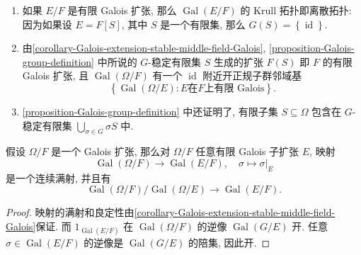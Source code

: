 \begin{remark}
  \label{remark-Galois-group-definition}
  \begin{enumerate}
    \item 如果 \( E/F \) 是有限 Galois 扩张, 那么 \( \operatorname{Gal}(E/F) \)
      的 Krull 拓扑即离散拓扑: 因为如果设 \( E = F[S] \), 其中 \( S \)
      是一个有限集, 那么 \( G(S) = \left\lbrace \operatorname{id} \right\rbrace
      \).
    \item 由\cref{corollary-Galois-extension-stable-middle-field-Galois},
      \cref{proposition-Galois-group-definition} 中所说的 \( G \)-稳定有限集 \(
      S \) 生成的扩张 \( F(S) \) 即 \( F \) 的有限 Galois 扩张, 且 \(
      \operatorname{Gal}(\Omega/F) \) 有一个 \( \operatorname{id} \)
      附近开正规子群邻域基
      \[
        \left\lbrace \operatorname{Gal}(\Omega/E) : E \text{在}F\text{上有限 Galois}
        \right\rbrace.
      \]
    \item \cref{proposition-Galois-group-definition} 中还证明了, 有限子集
      \( S \subseteq \Omega \) 包含在 \( G \)-稳定有限集 \( \bigcup_{\sigma \in
      G} \sigma S \) 中.
  \end{enumerate}
\end{remark}

\begin{proposition}
  \label{proposition-Galois-epimorphism-to-finite-Galois}
  假设 \( \Omega / F \) 是一个 Galois 扩张, 那么对 \( \Omega/F \) 任意有限 Galois
  子扩张 \( E \), 映射
  \[
    \operatorname{Gal}(\Omega/F)\to\operatorname{Gal}(E/F),\quad\sigma \mapsto
    \left. \sigma \right\vert_E
  \]
  是一个连续满射, 并且有
  \[
    \operatorname{Gal}(\Omega/F) / \operatorname{Gal}(\Omega/E) \to
    \operatorname{Gal}(E/F).
  \]
\end{proposition}
\begin{proof}
  映射的满射和良定性由\cref{corollary-Galois-extension-stable-middle-field-Galois}保证.
  而 \( 1_{\operatorname{Gal}(E/F)} \) 在 \(
  \operatorname{Gal}(\Omega/F) \) 的逆像 \( \operatorname{Gal}(G/E) \) 开.
  任意 \( \sigma \in \operatorname{Gal}(E/F) \) 的逆像是 \(
  \operatorname{Gal}(G/E) \) 的陪集, 因此开.
\end{proof}

